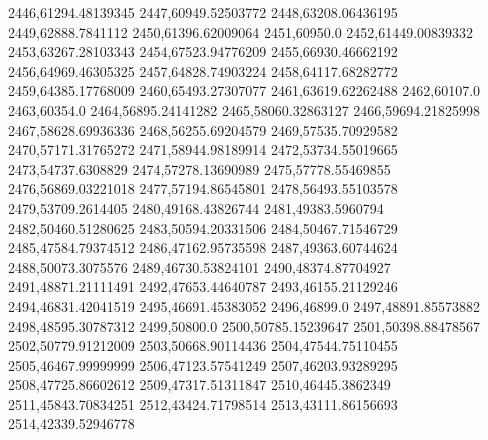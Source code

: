 2446,61294.48139345
2447,60949.52503772
2448,63208.06436195
2449,62888.7841112
2450,61396.62009064
2451,60950.0
2452,61449.00839332
2453,63267.28103343
2454,67523.94776209
2455,66930.46662192
2456,64969.46305325
2457,64828.74903224
2458,64117.68282772
2459,64385.17768009
2460,65493.27307077
2461,63619.62262488
2462,60107.0
2463,60354.0
2464,56895.24141282
2465,58060.32863127
2466,59694.21825998
2467,58628.69936336
2468,56255.69204579
2469,57535.70929582
2470,57171.31765272
2471,58944.98189914
2472,53734.55019665
2473,54737.6308829
2474,57278.13690989
2475,57778.55469855
2476,56869.03221018
2477,57194.86545801
2478,56493.55103578
2479,53709.2614405
2480,49168.43826744
2481,49383.5960794
2482,50460.51280625
2483,50594.20331506
2484,50467.71546729
2485,47584.79374512
2486,47162.95735598
2487,49363.60744624
2488,50073.3075576
2489,46730.53824101
2490,48374.87704927
2491,48871.21111491
2492,47653.44640787
2493,46155.21129246
2494,46831.42041519
2495,46691.45383052
2496,46899.0
2497,48891.85573882
2498,48595.30787312
2499,50800.0
2500,50785.15239647
2501,50398.88478567
2502,50779.91212009
2503,50668.90114436
2504,47544.75110455
2505,46467.99999999
2506,47123.57541249
2507,46203.93289295
2508,47725.86602612
2509,47317.51311847
2510,46445.3862349
2511,45843.70834251
2512,43424.71798514
2513,43111.86156693
2514,42339.52946778
